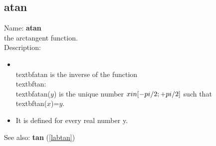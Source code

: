 \subsection{atan}
\label{labatan}
\noindent Name: \textbf{atan}\\
the arctangent function.\\
\noindent Description: \begin{itemize}

\item \\textbf{atan} is the inverse of the function \\textbf{tan}: \\textbf{atan}($y$) is the unique number \n   $x \\in [-\\pi/2; +\\pi/2]$ such that \\textbf{tan}($x$)=$y$.\n
\item It is defined for every real number y.\n\end{itemize}
See also: \textbf{tan} (\ref{labtan})

